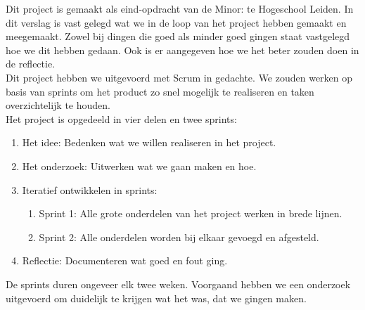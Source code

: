 Dit project is gemaakt als eind-opdracht van de Minor:  te Hogeschool Leiden. In dit verslag is vast gelegd wat we in de loop van het project hebben gemaakt en meegemaakt. Zowel bij dingen die goed als minder goed gingen staat vastgelegd hoe we dit hebben gedaan. Ook is er aangegeven hoe we het beter zouden doen in de reflectie.\\

Dit project hebben we uitgevoerd met Scrum in gedachte. We zouden werken op basis van sprints om het product zo snel mogelijk te realiseren en taken overzichtelijk te houden.\\

Het project is opgedeeld in vier delen en twee sprints:
\begin{enumerate}
    \item Het idee: Bedenken wat we willen realiseren in het project.
    \item Het onderzoek: Uitwerken wat we gaan maken en hoe.
    \item Iteratief ontwikkelen in sprints:
        \begin{enumerate}
            \item Sprint 1: Alle grote onderdelen van het project werken in brede lijnen.
            \item Sprint 2: Alle onderdelen worden bij elkaar gevoegd en afgesteld.
        \end{enumerate}
    \item Reflectie: Documenteren wat goed en fout ging.
\end{enumerate}

De sprints duren ongeveer elk twee weken. Voorgaand hebben we een onderzoek uitgevoerd om duidelijk te krijgen wat het was, dat we gingen maken.\\
